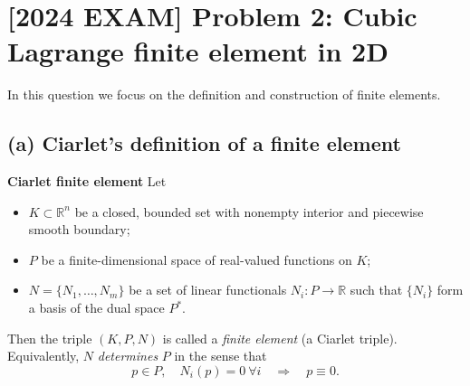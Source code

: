 \section*{[2024 EXAM] Problem 2: Cubic Lagrange finite element in 2D}
In this question we focus on the definition and construction of finite elements.
\subsection*{(a) Ciarlet's definition of a finite element}
\textbf{Ciarlet finite element}
Let
\begin{itemize}
    \item $K \subset \mathbb{R}^n$ be a closed, bounded set with nonempty interior and
          piecewise smooth boundary;
    \item $P$ be a finite-dimensional space of real-valued functions on $K$;
    \item $N = \{N_1,\dots,N_m\}$ be a set of linear functionals $N_i : P \to \mathbb{R}$ such
          that $\{N_i\}$ form a basis of the dual space $P^\ast$.
\end{itemize}
Then the triple $(K,P,N)$ is called a \emph{finite element} (a Ciarlet triple).
Equivalently, $N$ \emph{determines} $P$ in the sense that
\[
    p\in P,\quad N_i(p) = 0 \ \forall i \quad \Rightarrow\quad p \equiv 0.
\]
